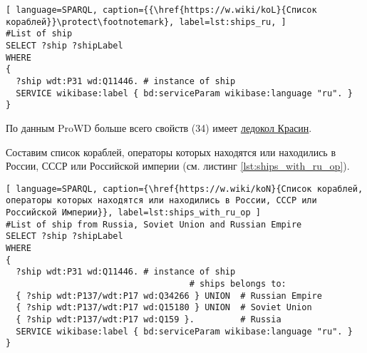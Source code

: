 \begin{lstlisting}[ language=SPARQL, caption={{\href{https://w.wiki/koL}{Список кораблей}}\protect\footnotemark}, label=lst:ships_ru, ]
#List of ship
SELECT ?ship ?shipLabel
WHERE
{
  ?ship wdt:P31 wd:Q11446. # instance of ship
  SERVICE wikibase:label { bd:serviceParam wikibase:language "ru". }
}
\end{lstlisting}

По данным ProWD больше всего свойств (34) имеет \href{https://www.wikidata.org/wiki/Q281147}{ледокол Красин}\cite{ProWD_ru_ships}.

Составим список кораблей, операторы которых находятся или находились в России, СССР или Российской империи (см. листинг \ref{lst:ships_with_ru_op}).

\begin{lstlisting}[ language=SPARQL, caption={\href{https://w.wiki/koN}{Cписок кораблей, операторы которых находятся или находились в России, СССР или Российской Империи}}, label=lst:ships_with_ru_op ]
#List of ship from Russia, Soviet Union and Russian Empire
SELECT ?ship ?shipLabel
WHERE
{
  ?ship wdt:P31 wd:Q11446. # instance of ship
                                    # ships belongs to:
  { ?ship wdt:P137/wdt:P17 wd:Q34266 } UNION  # Russian Empire
  { ?ship wdt:P137/wdt:P17 wd:Q15180 } UNION  # Soviet Union
  { ?ship wdt:P137/wdt:P17 wd:Q159 }.         # Russia
  SERVICE wikibase:label { bd:serviceParam wikibase:language "ru". }
}
\end{lstlisting}




